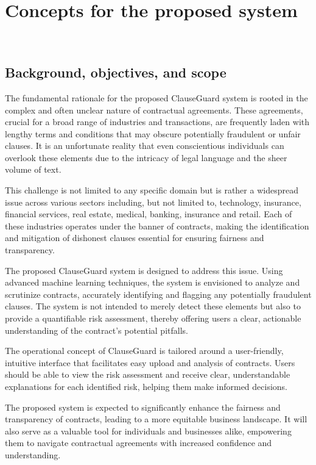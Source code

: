 \chapter{Concepts for the proposed system \\
\label{Chapter::Concepts for the proposed system}}\



\section{Background, objectives, and scope \label{Section::Background,objectives,and scope proposed}}
The fundamental rationale for the proposed ClauseGuard system is rooted in the complex and often unclear nature of contractual agreements. These agreements, crucial for a broad range of industries and transactions, are frequently laden with lengthy terms and conditions that may obscure potentially fraudulent or unfair clauses. It is an unfortunate reality that even conscientious individuals can overlook these elements due to the intricacy of legal language and the sheer volume of text.

This challenge is not limited to any specific domain but is rather a widespread issue across various sectors including, but not limited to, technology, insurance, financial services, real estate, medical, banking, insurance and retail. Each of these industries operates under the banner of contracts, making the identification and mitigation of dishonest clauses essential for ensuring fairness and transparency.

The proposed ClauseGuard system is designed to address this issue. Using advanced machine learning techniques, the system is envisioned to analyze and scrutinize contracts, accurately identifying and flagging any potentially fraudulent clauses. The system is not intended to merely detect these elements but also to provide a quantifiable risk assessment, thereby offering users a clear, actionable understanding of the contract's potential pitfalls. 

 The operational concept of ClauseGuard is tailored around a user-friendly, intuitive interface that facilitates easy upload and analysis of contracts. Users should be able to view the risk assessment and receive clear, understandable explanations for each identified risk, helping them make informed decisions.

The proposed system is expected to significantly enhance the fairness and transparency of contracts, leading to a more equitable business landscape. It will also serve as a valuable tool for individuals and businesses alike, empowering them to navigate contractual agreements with increased confidence and understanding.


